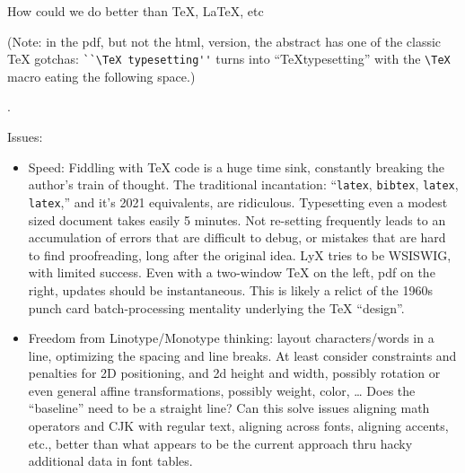 \documentclass[12pt]{PalisadesLakesBook}
\begin{document}
\begin{plSection}{How could we do better than \TeX, \LaTeX, etc}



(Note: in the pdf, but not the html, version, 
the abstract has one of the classic {\TeX} gotchas:
\verb|``\TeX typesetting''| turns into
``\TeX typesetting'' with the \verb|\TeX| macro eating the 
following space.)

.

Issues:
\begin{itemize}
  
  \item Speed: Fiddling with {\TeX} code is a huge time sink, 
  constantly breaking 
  the author's train of thought.
  The traditional incantation: 
  ``\texttt{latex}, \texttt{bibtex}, \texttt{latex}, \texttt{latex},''
  and it's 2021 equivalents, are ridiculous.
  Typesetting even a modest sized document takes easily 5 minutes.
  Not re-setting frequently leads to an accumulation of errors
  that are difficult to debug, or mistakes that are hard to find
  proofreading, long after the original idea.
  LyX tries to be WSISWIG, with limited success.
  Even with a two-window {\TeX} on the left, pdf on the right,
  updates should be instantaneous.
  This is likely a relict of the 1960s punch card batch-processing
  mentality underlying the {\TeX} ``design''.
  
  \item Freedom from Linotype/Monotype thinking: 
  layout characters/words in a line, optimizing the spacing
  and line breaks.
  At least consider constraints and penalties for 2D positioning,
  and 2d height and width, possibly rotation
  or even general affine transformations,
  possibly weight, color, \ldots
  Does the ``baseline'' need to be a straight line?
  Can this solve issues aligning math operators and CJK 
  with regular text, aligning across fonts, aligning accents, 
  etc., better than what appears to be the current approach thru
  hacky additional data in font tables.
  
\end{itemize}

\end{plSection}%

\BeginAppendices

\end{document}
